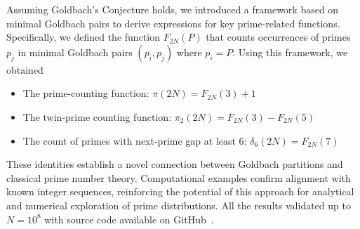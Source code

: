 Assuming Goldbach's Conjecture holds, we introduced a framework based on minimal
Goldbach pairs to derive expressions for key prime-related functions.
Specifically, we defined the function $F_{2N}(P)$ that counts occurrences of primes $p_j$ in minimal Goldbach
pairs $(p_i, p_j)$ where $p_i = P$.
Using this framework, we obtained

\begin{itemize}
    \item The prime-counting function: $\pi(2N) = F_{2N}(3) + 1$
    \item The twin-prime counting function: $\pi_2(2N) = F_{2N}(3) - F_{2N}(5)$
    \item The count of primes with next-prime gap at least 6: $\delta_6(2N) = F_{2N}(7)$
\end{itemize}

These identities establish a novel connection between Goldbach partitions and classical prime number theory.
Computational examples confirm alignment with known integer sequences, reinforcing the potential
of this approach for analytical and numerical exploration of prime distributions.
All the results validated up to $N=10^8$ with source code available on
GitHub~\cite{kolosovpetro2025minimalgoldbachpairs}.
